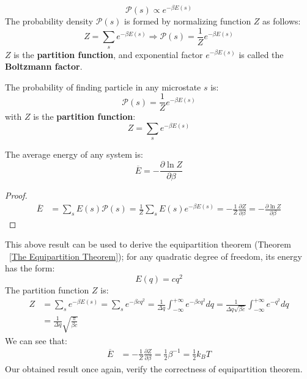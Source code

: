 \documentclass[subfile]{~/PhyAI/phyai.tex}
\begin{document}
$$ \mathcal{P}(s)\propto e^{-\beta E(s)} $$
The probability density $\mathcal{P}(s)$ is formed by normalizing function $Z$ as follows:
$$ Z=\sum_{s}e^{-\beta E(s)}\Rightarrow \mathcal{P}(s)=\frac{1 }{Z}e^{-\beta E(s)} $$
$Z$ is the \textbf{partition function}, and exponential factor $e^{-\beta E(s)}$ is called the \textbf{Boltzmann factor}.
\begin{definition}
	\label{Boltzmann Distribution}
	The probability of finding particle in any microstate $s$ is:
	$$ \mathcal{P}(s)=\frac{1 }{Z}e^{-\beta E(s)} $$
	with $Z$ is the \textbf{partition function}: $$ Z=\sum_{s}e^{-\beta E(s)} $$
\end{definition}
\begin{corollary}
	\label{Average Energy}
	The average energy of any system is:
	$$ \overline{E}=-\frac{\partial \ln{Z} }{\partial \beta} $$
\end{corollary}
\begin{proof}
	\begin{equation*}
		\begin{split}
			\overline{E}&=\sum_{s}E(s)\mathcal{P}(s)=\frac{1 }{Z}\sum_{s}E(s)e^{-\beta E(s)}=-\frac{1 }{Z}\frac{\partial Z }{\partial \beta}=-\frac{\partial \ln{Z} }{\partial \beta}
		\end{split}
	\end{equation*}
\end{proof}
This above result can be used to derive the equipartition theorem (Theorem ~\ref{The Equipartition Theorem}); for any quadratic degree of freedom, its energy has the form:
$$ E(q)=cq^{2} $$
The partition function $Z$ is:
\begin{equation*}
	\begin{split}
		Z&=\sum_{s}e^{-\beta E(s)}=\sum_{s}e^{-\beta cq^{2}}=\frac{1 }{\Delta q}\int_{-\infty }^{+\infty}e^{-\beta cq^{2}}dq=\frac{1 }{\Delta q\sqrt{\beta c}}\int_{-\infty }^{+\infty}e^{-q^{2}}dq\\
		&=\frac{1 }{\Delta q}\sqrt{\frac{\pi }{\beta c}}
	\end{split}
\end{equation*}
We can see that:
\begin{equation*}
	\begin{split}
		\overline{E}&=-\frac{1 }{Z}\frac{\partial Z }{\partial \beta}=\frac{1 }{2}\beta^{-1}=\frac{1 }{2}k_{B}T
	\end{split}
\end{equation*}
Our obtained result once again, verify the correctness of equipartition theorem.
\end{document}
